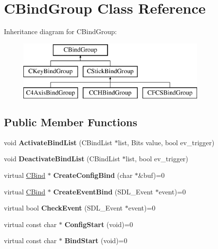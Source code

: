\hypertarget{classCBindGroup}{\section{C\-Bind\-Group Class Reference}
\label{classCBindGroup}
}
Inheritance diagram for C\-Bind\-Group\-:\begin{figure}[H]
\begin{center}
\leavevmode
\includegraphics[height=3.000000cm]{classCBindGroup}
\end{center}
\end{figure}
\subsection*{Public Member Functions}
\begin{DoxyCompactItemize}
\item 
\hypertarget{classCBindGroup_a3b5ce6e0f8d7b2305b5038e050126314}{void {\bfseries Activate\-Bind\-List} (C\-Bind\-List $\ast$list, Bits value, bool ev\-\_\-trigger)}\label{classCBindGroup_a3b5ce6e0f8d7b2305b5038e050126314}

\item 
\hypertarget{classCBindGroup_ae60d18174ee4b6c9087ae167aeeb2f12}{void {\bfseries Deactivate\-Bind\-List} (C\-Bind\-List $\ast$list, bool ev\-\_\-trigger)}\label{classCBindGroup_ae60d18174ee4b6c9087ae167aeeb2f12}

\item 
\hypertarget{classCBindGroup_a5a8bf8b22df1d052fc7c3b78b04ffc27}{virtual \hyperlink{classCBind}{C\-Bind} $\ast$ {\bfseries Create\-Config\-Bind} (char $\ast$\&buf)=0}\label{classCBindGroup_a5a8bf8b22df1d052fc7c3b78b04ffc27}

\item 
\hypertarget{classCBindGroup_a716bd1ffed3fb274b87b8c7d99952cdd}{virtual \hyperlink{classCBind}{C\-Bind} $\ast$ {\bfseries Create\-Event\-Bind} (S\-D\-L\-\_\-\-Event $\ast$event)=0}\label{classCBindGroup_a716bd1ffed3fb274b87b8c7d99952cdd}

\item 
\hypertarget{classCBindGroup_abf8f699abfcce73950da882f21d9fbd2}{virtual bool {\bfseries Check\-Event} (S\-D\-L\-\_\-\-Event $\ast$event)=0}\label{classCBindGroup_abf8f699abfcce73950da882f21d9fbd2}

\item 
\hypertarget{classCBindGroup_a197ef5cc8af11acc04667d6838b171c9}{virtual const char $\ast$ {\bfseries Config\-Start} (void)=0}\label{classCBindGroup_a197ef5cc8af11acc04667d6838b171c9}

\item 
\hypertarget{classCBindGroup_a737ef10817e0deb3df1eb83bfa42d838}{virtual const char $\ast$ {\bfseries Bind\-Start} (void)=0}\label{classCBindGroup_a737ef10817e0deb3df1eb83bfa42d838}

\end{DoxyCompactItemize}


